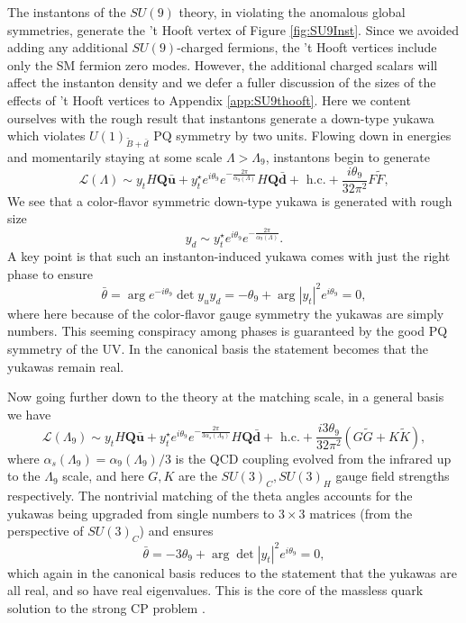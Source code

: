 \documentclass[11pt,a4paper]{article}
\begin{document}
The instantons of the $SU(9)$ theory, in violating the anomalous global symmetries, generate the 't Hooft vertex of Figure \ref{fig:SU9Inst}.
Since we avoided adding any additional $SU(9)$-charged fermions, the 't Hooft vertices include only the SM fermion zero modes. However, the additional charged scalars will affect the instanton density and we defer a fuller discussion of the sizes of the effects of 't Hooft vertices to Appendix \ref{app:SU9thooft}. Here we content ourselves with the rough result that instantons generate a down-type yukawa which violates $U(1)_{\tilde{B}+\bar d}$ PQ symmetry by two units. Flowing down in energies and momentarily staying at some scale $\Lambda > \Lambda_9$, instantons begin to generate 
\begin{equation}
    \mathcal{L}(\Lambda) \sim y_t H \mathbf{Q} \mathbf{\bar u} +  y_t^\star e^{i \theta_9} e^{-\frac{2\pi}{\alpha_9(\Lambda)}} H \mathbf{Q} \mathbf{\bar d}  + \text{ h.c.} + \frac{i \theta_9}{32\pi^2} F \tilde{F},
\end{equation}
%
We see that a color-flavor symmetric down-type yukawa is generated with rough size
%
\begin{equation}
    y_d \sim y_t^\star e^{i \theta_9} e^{-\frac{2\pi}{\alpha_9(\Lambda)}}.
\end{equation}
%
A key point is that such an instanton-induced yukawa comes with just the right phase to ensure 
\begin{equation}
    \bar \theta = \arg e^{- i \theta_9} \det  y_u y_d = -\theta_9 + \arg |y_t|^2 e^{i\theta_9} = 0,
\end{equation}
where here because of the color-flavor gauge symmetry the yukawas are simply numbers. 
This seeming conspiracy among phases is guaranteed by the good PQ symmetry of the UV. In the canonical basis the statement becomes that the yukawas remain real.

Now going further down to the theory at the matching scale, in a general basis we have
\begin{equation} \label{eqn:genBottomYuk}
    \mathcal{L}(\Lambda_9) \sim y_t H \mathbf{Q} \mathbf{\bar u} +  y_t^\star e^{i \theta_9} e^{-\frac{2\pi}{3 \alpha_s(\Lambda_9)}} H \mathbf{Q} \mathbf{\bar d}  + \text{ h.c.} + \frac{i 3 \theta_9}{32\pi^2} \left( G \tilde{G} + K \tilde{K}\right) ,
\end{equation}
where $\alpha_s(\Lambda_9) = \alpha_9(\Lambda_9)/3$ is the QCD coupling evolved from the infrared up to the $\Lambda_9$ scale, and here $G, K$ are the $SU(3)_C, SU(3)_H$ gauge field strengths respectively. 
The nontrivial matching of the theta angles accounts for the yukawas being upgraded from single numbers to $3 \times 3$ matrices (from the perspective of $SU(3)_C$) and ensures 
\begin{equation}
    \bar \theta = - 3 \theta_9 + \arg \det |y_t|^2 e^{i \theta_9} = 0,
\end{equation}
which again in the canonical basis reduces to the statement that the yukawas are all real, and so have real eigenvalues.
This is the core of the massless quark solution to the strong CP problem \cite{Georgi:128245,Kaplan:1986ru,Choi:1988sy,Srednicki:2005wc}.
\end{document}
